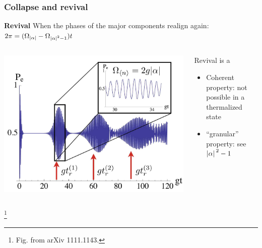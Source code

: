 \documentclass[t]{beamer}
\newcommand\blfootnote[1]{%
\begingroup
\renewcommand\thefootnote{}\footnote{#1}%
\addtocounter{footnote}{-1}%
\endgroup
}
\begin{document}
\begin{frame}
\frametitle{Collapse and revival}

\textbf{Revival} When the phases of the major components realign again: $2\pi = (\Omega_{\abs*{\alpha}} - \Omega_{\abs*{\alpha}^2 - 1}) t$

\begin{columns}[T]
    \begin{column}{0.6\textwidth}
        \begin{center}
            \includegraphics[width=\textwidth]{figs/collapse-revival.PNG}
    \end{center}
    \end{column}
    \begin{column}{0.4\textwidth}
        Revival is a
        \begin{itemize}
            \item Coherent property: not possible in a thermalized state
            \item ``granular'' property: see $\abs*{\alpha}^2-1$ 
        \end{itemize} 
    \end{column}
\end{columns}

\blfootnote{Fig. from arXiv 1111.1143.}

\end{frame}
\end{document}
